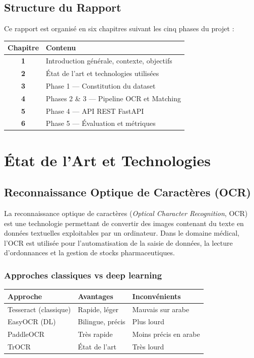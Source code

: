\documentclass[12pt,a4paper]{report}
\newcommand{\en}[1]{\textit{\textit{#1}}}
\begin{document}
\section{Structure du Rapport}

Ce rapport est organis\'e en six chapitres suivant les cinq phases du projet :

\begin{center}
\begin{tabular}{>{\bfseries\color{primary}}c l}
\toprule
Chapitre & Contenu \\
\midrule
1 & Introduction g\'en\'erale, contexte, objectifs \\
2 & \'Etat de l'art et technologies utilis\'ees \\
3 & Phase 1 --- Constitution du dataset \\
4 & Phases 2 \& 3 --- Pipeline OCR et Matching \\
5 & Phase 4 --- API REST FastAPI \\
6 & Phase 5 --- \'Evaluation et m\'etriques \\
\bottomrule
\end{tabular}
\end{center}

\chapter{\'Etat de l'Art et Technologies}

\section{Reconnaissance Optique de Caract\`eres (OCR)}

La reconnaissance optique de caract\`eres (\en{Optical Character Recognition}, OCR) est une technologie permettant de convertir des images contenant du texte en donn\'ees textuelles exploitables par un ordinateur. Dans le domaine m\'edical, l'OCR est utilis\'ee pour l'automatisation de la saisie de donn\'ees, la lecture d'ordonnances et la gestion de stocks pharmaceutiques.

\subsection{Approches classiques vs deep learning}

\begin{center}
\begin{tabular}{lll}
\toprule
\textbf{Approche} & \textbf{Avantages} & \textbf{Inconv\'enients} \\
\midrule
Tesseract (classique) & Rapide, l\'eger & Mauvais sur arabe \\
EasyOCR (DL) & Bilingue, pr\'ecis & Plus lourd \\
PaddleOCR & Tr\`es rapide & Moins pr\'ecis en arabe \\
TrOCR & \'Etat de l'art & Tr\`es lourd \\
\bottomrule
\end{tabular}
\end{center}
\end{document}
